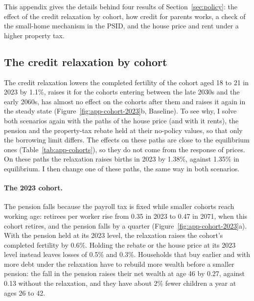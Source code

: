 This appendix gives the details behind four results of
Section~\ref{sec:policy}: the effect of the credit relaxation by cohort, how
credit for parents works, a check of the small-home mechanism in the PSID,
and the house price and rent under a higher property tax.

\subsection{The credit relaxation by cohort}
\label{app:policy-cohorts}

The credit relaxation lowers the completed fertility of the cohort aged 18 to
21 in 2023 by 1.1\%, raises it for the cohorts entering between the late 2030s
and the early 2060s, has almost no effect on the cohorts after them and raises
it again in the steady state (Figure~\ref{fig:app-cohort-2023}b, Baseline). To see
why, I solve both scenarios again with the paths of the house price (and with
it rents), the pension and the property-tax rebate held at their no-policy
values, so that only the borrowing limit differs. The effects on these paths
are close to the equilibrium ones (Table~\ref{tab:app-cohorts}), so they do
not come from the response of prices. On these paths the relaxation raises births in 2023
by 1.38\%, against 1.35\% in equilibrium. I then change one of these paths, the
same way in both scenarios.

\paragraph{The 2023 cohort.} The pension falls because the payroll tax is
fixed while smaller cohorts reach working age: retirees per worker rise from
0.35 in 2023 to 0.47 in 2071, when this cohort retires, and the pension falls
by a quarter (Figure~\ref{fig:app-cohort-2023}a). With the pension held at its
2023 level, the relaxation raises the cohort's completed fertility by 0.6\%.
Holding the rebate or the house price at its 2023 level instead leaves losses
of 0.5\% and 0.3\%. Households that buy earlier and with more debt under the
relaxation have to rebuild more wealth before a smaller pension: the fall in
the pension raises their net wealth at age 46 by 0.27, against 0.13 without
the relaxation, and they have about 2\% fewer children a year at ages 26 to 42.

